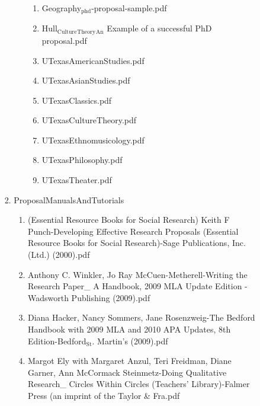 \documentclass[11pt]{article}
\begin{document}
\begin{enumerate}
\begin{enumerate}
\begin{enumerate}
\begin{enumerate}
\begin{enumerate}
\begin{enumerate}
\item Geography$_{\text{phd}}$-proposal-sample.pdf
\label{sec-1-1-1-1-8-8-13-9-2-4-3}

\item Hull$_{\text{Culture}}$$_{\text{Theory}}$$_{\text{An}}$ Example of a successful PhD proposal.pdf
\label{sec-1-1-1-1-8-8-13-9-2-4-4}

\item UTexasAmericanStudies.pdf
\label{sec-1-1-1-1-8-8-13-9-2-4-5}

\item UTexasAsianStudies.pdf
\label{sec-1-1-1-1-8-8-13-9-2-4-6}

\item UTexasClassics.pdf
\label{sec-1-1-1-1-8-8-13-9-2-4-7}

\item UTexasCultureTheory.pdf
\label{sec-1-1-1-1-8-8-13-9-2-4-8}

\item UTexasEthnomusicology.pdf
\label{sec-1-1-1-1-8-8-13-9-2-4-9}

\item UTexasPhilosophy.pdf
\label{sec-1-1-1-1-8-8-13-9-2-4-10}

\item UTexasTheater.pdf
\label{sec-1-1-1-1-8-8-13-9-2-4-11}
\end{enumerate}
\end{enumerate}

\item ProposalManualsAndTutorials
\label{sec-1-1-1-1-8-8-13-9-3}
\begin{enumerate}
\item (Essential Resource Books for Social Research) Keith F Punch-Developing Effective Research Proposals (Essential Resource Books for Social Research)-Sage Publications, Inc. (Ltd.) (2000).pdf
\label{sec-1-1-1-1-8-8-13-9-3-1}

\item Anthony C. Winkler, Jo Ray McCuen-Metherell-Writing the Research Paper\_ A Handbook, 2009 MLA Update Edition  -Wadsworth Publishing (2009).pdf
\label{sec-1-1-1-1-8-8-13-9-3-2}

\item Diana Hacker, Nancy Sommers, Jane Rosenzweig-The Bedford Handbook with 2009 MLA and 2010 APA Updates, 8th Edition-Bedford$_{\text{St}}$. Martin's (2009).pdf
\label{sec-1-1-1-1-8-8-13-9-3-3}

\item Margot Ely with Margaret Anzul, Teri Freidman, Diane Garner, Ann McCormack Steinmetz-Doing Qualitative Research\_ Circles Within Circles (Teachers' Library)-Falmer Press (an imprint of the Taylor \& Fra.pdf
\label{sec-1-1-1-1-8-8-13-9-3-4}


\end{enumerate}
\end{enumerate}
\end{enumerate}
\end{enumerate}
\end{enumerate}
\end{document}
